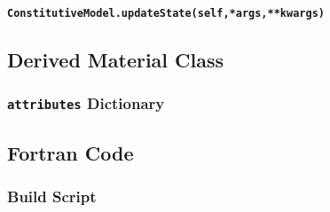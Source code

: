 \documentclass[11pt]{article}
\begin{document}
\paragraph{\texttt{ConstitutiveModel.\textbf{updateState}(self,*args,**kwargs)}}

\subsection{Derived Material Class}
\subsubsection{\texttt{attributes} Dictionary}

\subsection{Fortran Code}
\subsubsection{Build Script}
\end{document}
